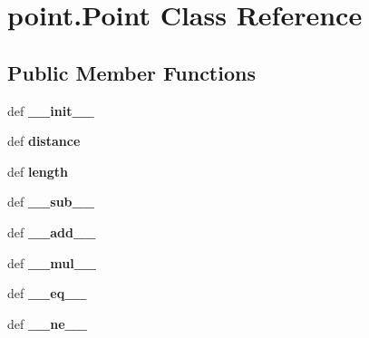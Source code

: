 \hypertarget{classpoint_1_1Point}{\section{point.\-Point \-Class \-Reference}
\label{classpoint_1_1Point}
}
\subsection*{\-Public \-Member \-Functions}
\begin{DoxyCompactItemize}
\item 
\hypertarget{classpoint_1_1Point_a4f2882f4c1d41b8ed0dcc040a56df10e}{def {\bfseries \-\_\-\-\_\-init\-\_\-\-\_\-}}\label{classpoint_1_1Point_a4f2882f4c1d41b8ed0dcc040a56df10e}

\item 
\hypertarget{classpoint_1_1Point_a264271867986638bc9e3ae0a840162fe}{def {\bfseries distance}}\label{classpoint_1_1Point_a264271867986638bc9e3ae0a840162fe}

\item 
\hypertarget{classpoint_1_1Point_a0d4c78d38503e867498c93e1e3dbf3ea}{def {\bfseries length}}\label{classpoint_1_1Point_a0d4c78d38503e867498c93e1e3dbf3ea}

\item 
\hypertarget{classpoint_1_1Point_a63d6c9a6aaf7b41618ff8b18336eb6bd}{def {\bfseries \-\_\-\-\_\-sub\-\_\-\-\_\-}}\label{classpoint_1_1Point_a63d6c9a6aaf7b41618ff8b18336eb6bd}

\item 
\hypertarget{classpoint_1_1Point_aace59f3313d86fffb9315171d1f68440}{def {\bfseries \-\_\-\-\_\-add\-\_\-\-\_\-}}\label{classpoint_1_1Point_aace59f3313d86fffb9315171d1f68440}

\item 
\hypertarget{classpoint_1_1Point_a80283dba741108b5fe172a347eb6eb79}{def {\bfseries \-\_\-\-\_\-mul\-\_\-\-\_\-}}\label{classpoint_1_1Point_a80283dba741108b5fe172a347eb6eb79}

\item 
\hypertarget{classpoint_1_1Point_a4bea16b9083d9db27ded3f34b4ba4f61}{def {\bfseries \-\_\-\-\_\-eq\-\_\-\-\_\-}}\label{classpoint_1_1Point_a4bea16b9083d9db27ded3f34b4ba4f61}

\item 
\hypertarget{classpoint_1_1Point_a6b2c8b7b7297d1c49f7dd7145a91dea9}{def {\bfseries \-\_\-\-\_\-ne\-\_\-\-\_\-}}\label{classpoint_1_1Point_a6b2c8b7b7297d1c49f7dd7145a91dea9}


\end{DoxyCompactItemize}
